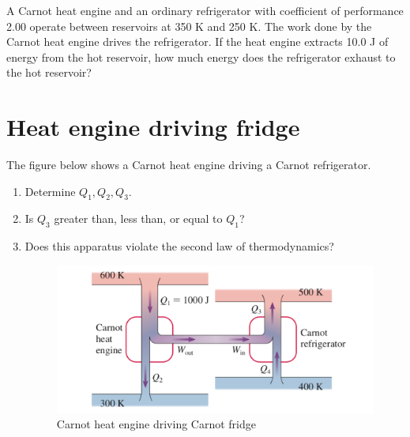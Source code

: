 \documentclass[12pt]{article}
\begin{document}
A Carnot heat engine and an ordinary refrigerator with coefficient of performance 2.00 operate between reservoirs at 350 K and 250 K. The work done by the Carnot heat engine drives the refrigerator. If the heat engine extracts 10.0 J of energy from the hot reservoir, how much energy does the refrigerator exhaust to the hot reservoir?



\newpage
\section{Heat engine driving fridge}

The figure below shows a Carnot heat engine driving a Carnot refrigerator.

\begin{enumerate}
\item Determine $Q_1, Q_2, Q_3$.
\item Is $Q_3$ greater than, less than, or equal to $Q_1$?
\item Does this apparatus violate the second law of thermodynamics?


\begin{figure}[h!]
\centering
\includegraphics[width=0.5\linewidth]{Final_1}
\caption{Carnot heat engine driving Carnot fridge}
\end{figure}
\end{enumerate}
\end{document}
